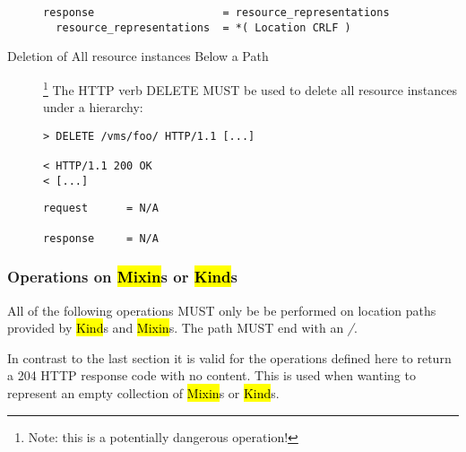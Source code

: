 \documentclass[10pt,a4paper]{article}
\begin{document}
\begin{description}
\begin{verbatim}
response                    = resource_representations
  resource_representations  = *( Location CRLF ) 
\end{verbatim}

  \item[Deletion of All resource instances Below a
    Path]\footnote{Note: this is a potentially dangerous operation!}
    The HTTP verb DELETE MUST be used to delete all resource instances
    under a hierarchy:

\begin{verbatim}
> DELETE /vms/foo/ HTTP/1.1 [...]
 
< HTTP/1.1 200 OK
< [...]
\end{verbatim}

\begin{verbatim}
request      = N/A

response     = N/A
\end{verbatim}

\end{description}

\subsubsection{Operations on \hl{Mixin}s or \hl{Kind}s}
\label{sec:mixin_and_kind_operations}
All of the following operations MUST only be be performed on location
paths provided by \hl{Kind}s and \hl{Mixin}s. The path MUST end with
an \emph{/}.

In contrast to the last section it is valid for the operations defined
here to return a 204 HTTP response code with no content. This is used
when wanting to represent an empty collection of \hl{Mixin}s or
\hl{Kind}s.
\end{document}
